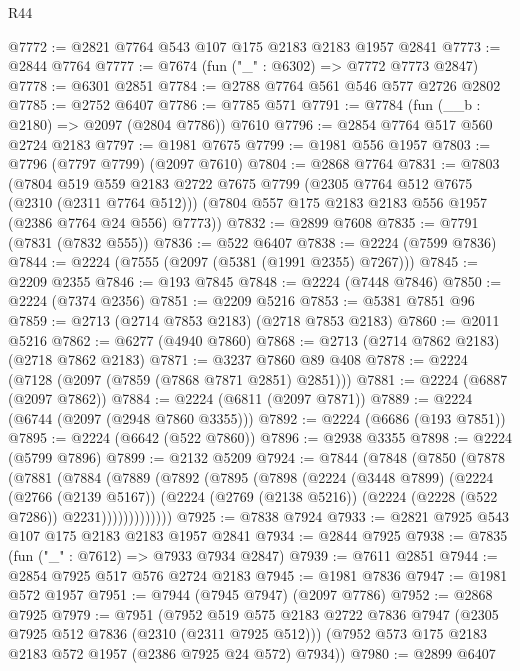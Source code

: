 \begin{lexlean}{R44}
\begin{coremodule}
@7772 := @2821 @7764 @543 @107 @175 @2183 @2183 @1957 @2841
@7773 := @2844 @7764
@7777 := @7674 (fun ("_" : @6302) => @7772 @7773 @2847)
@7778 := @6301 @2851
@7784 := @2788 @7764 @561 @546 @577 @2726 @2802
@7785 := @2752 @6407
@7786 := @7785 @571
@7791 := @7784 (fun (__b : @2180) => @2097 (@2804 @7786)) @7610
@7796 := @2854 @7764 @517 @560 @2724 @2183
@7797 := @1981 @7675
@7799 := @1981 @556 @1957
@7803 := @7796 (@7797 @7799) (@2097 @7610)
@7804 := @2868 @7764
@7831 := @7803
    (@7804
      @519
      @559
      @2183
      @2722
      @7675
      @7799
      (@2305 @7764 @512 @7675 (@2310 (@2311 @7764 @512)))
      (@7804 @557 @175 @2183 @2183 @556 @1957 (@2386 @7764 @24 @556) @7773))
@7832 := @2899 @7608
@7835 := @7791 (@7831 (@7832 @555))
@7836 := @522 @6407
@7838 := @2224 (@7599 @7836)
@7844 := @2224 (@7555 (@2097 (@5381 (@1991 @2355) @7267)))
@7845 := @2209 @2355
@7846 := @193 @7845
@7848 := @2224 (@7448 @7846)
@7850 := @2224 (@7374 @2356)
@7851 := @2209 @5216
@7853 := @5381 @7851 @96
@7859 := @2713 (@2714 @7853 @2183) (@2718 @7853 @2183)
@7860 := @2011 @5216
@7862 := @6277 (@4940 @7860)
@7868 := @2713 (@2714 @7862 @2183) (@2718 @7862 @2183)
@7871 := @3237 @7860 @89 @408
@7878 := @2224 (@7128 (@2097 (@7859 (@7868 @7871 @2851) @2851)))
@7881 := @2224 (@6887 (@2097 @7862))
@7884 := @2224 (@6811 (@2097 @7871))
@7889 := @2224 (@6744 (@2097 (@2948 @7860 @3355)))
@7892 := @2224 (@6686 (@193 @7851))
@7895 := @2224 (@6642 (@522 @7860))
@7896 := @2938 @3355
@7898 := @2224 (@5799 @7896)
@7899 := @2132 @5209
@7924 := @7844
    (@7848
      (@7850
        (@7878
          (@7881
            (@7884
              (@7889
                (@7892
                  (@7895
                    (@7898
                      (@2224
                        (@3448 @7899)
                        (@2224
                          (@2766 (@2139 @5167))
                          (@2224
                            (@2769 (@2138 @5216))
                            (@2224 (@2228 (@522 @7286)) @2231)))))))))))))
@7925 := @7838 @7924
@7933 := @2821 @7925 @543 @107 @175 @2183 @2183 @1957 @2841
@7934 := @2844 @7925
@7938 := @7835 (fun ("_" : @7612) => @7933 @7934 @2847)
@7939 := @7611 @2851
@7944 := @2854 @7925 @517 @576 @2724 @2183
@7945 := @1981 @7836
@7947 := @1981 @572 @1957
@7951 := @7944 (@7945 @7947) (@2097 @7786)
@7952 := @2868 @7925
@7979 := @7951
    (@7952
      @519
      @575
      @2183
      @2722
      @7836
      @7947
      (@2305 @7925 @512 @7836 (@2310 (@2311 @7925 @512)))
      (@7952 @573 @175 @2183 @2183 @572 @1957 (@2386 @7925 @24 @572) @7934))
@7980 := @2899 @6407

\end{coremodule}
\end{lexlean}
